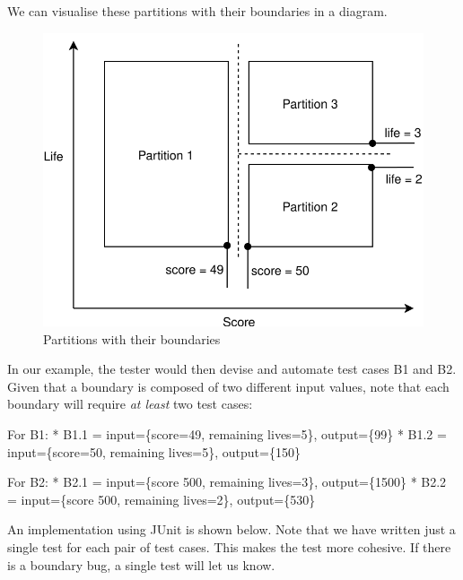 We can visualise these partitions with their boundaries in a diagram.

\begin{figure}
\centering
\includegraphics{img/boundary-testing/examples/partition_boundaries.svg}
\caption{Partitions with their boundaries}
\end{figure}

In our example, the tester would then devise and automate test cases B1
and B2. Given that a boundary is composed of two different input values,
note that each boundary will require \emph{at least} two test cases:

For B1: * B1.1 = input=\{score=49, remaining lives=5\}, output=\{99\} *
B1.2 = input=\{score=50, remaining lives=5\}, output=\{150\}

For B2: * B2.1 = input=\{score 500, remaining lives=3\}, output=\{1500\}
* B2.2 = input=\{score 500, remaining lives=2\}, output=\{530\}

An implementation using JUnit is shown below. Note that we have written
just a single test for each pair of test cases. This makes the test more
cohesive. If there is a boundary bug, a single test will let us know.

